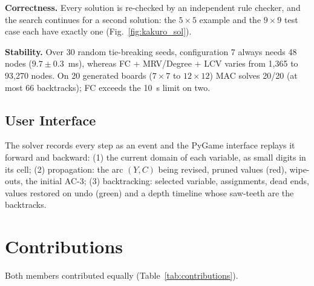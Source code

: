 \documentclass[conference]{IEEEtran}
\begin{document}
\textbf{Correctness.} Every solution is re-checked by an independent rule checker, and the search continues for a second solution: the $5\times 5$ example and the $9\times 9$ test case each have exactly one (Fig.~\ref{fig:kakuro_sol}).

\textbf{Stability.} Over 30 random tie-breaking seeds, configuration 7 always needs 48 nodes ($9.7\pm 0.3$~ms), whereas FC + MRV/Degree + LCV varies from 1,365 to 93,270 nodes. On 20 generated boards ($7\times 7$ to $12\times 12$) MAC solves 20/20 (at most 66 backtracks); FC exceeds the 10~s limit on two.

\subsection{User Interface}
The solver records every step as an event and the PyGame interface replays it forward and backward: (1) the current domain of each variable, as small digits in its cell; (2) propagation: the arc $(Y,C)$ being revised, pruned values (red), wipe-outs, the initial AC-3; (3) backtracking: selected variable, assignments, dead ends, values restored on undo (green) and a depth timeline whose saw-teeth are the backtracks.

\section{Contributions}
Both members contributed equally (Table~\ref{tab:contributions}).

\begin{table}[htbp]
\caption{Individual Contributions and Completion}
\label{tab:contributions}
\centering
{}
\end{table}
\end{document}
